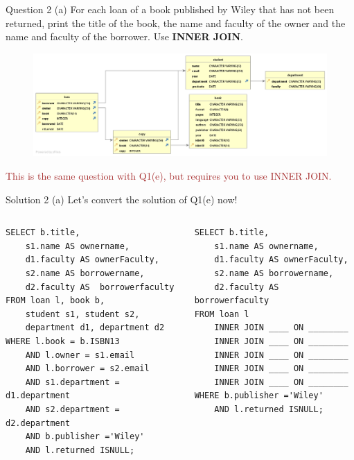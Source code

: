 \begin{frame}[fragile]{Question 2 (a)}
For each loan of a book published by Wiley that has not been returned, print the title of the book, the name and faculty of the owner and the name and faculty of the borrower. Use \textbf{INNER JOIN}.

\begin{figure}
	\includegraphics[width=1\textwidth]{t1/images/t1-end.png}
\end{figure}

\textcolor{brown}{This is the same question with Q1(e), but requires you to use INNER JOIN.}
\end{frame}

\begin{frame}[fragile]{Solution 2 (a)}
Let's convert the solution of Q1(e) now!\\
\vspace{10pt}

\begin{columns}

\begin{lstlisting}
SELECT b.title, 
	s1.name AS ownername, 
	d1.faculty AS ownerFaculty, 
	s2.name AS borrowername, 
	d2.faculty AS  borrowerfaculty
FROM loan l, book b,  
	student s1, student s2, 
	department d1, department d2
WHERE l.book = b.ISBN13
	AND l.owner = s1.email
	AND l.borrower = s2.email
	AND s1.department = d1.department
	AND s2.department = d2.department
	AND b.publisher ='Wiley'
	AND l.returned ISNULL;
\end{lstlisting}

\begin{lstlisting}
SELECT b.title, 
	s1.name AS ownername, 
	d1.faculty AS ownerFaculty, 
	s2.name AS borrowername, 
	d2.faculty AS  borrowerfaculty
FROM loan l 
	INNER JOIN ____ ON ________
	INNER JOIN ____ ON ________
	INNER JOIN ____ ON ________
	INNER JOIN ____ ON ________
	INNER JOIN ____ ON ________
WHERE b.publisher ='Wiley'
	AND l.returned ISNULL;
\end{lstlisting}
\end{columns}
	
\end{frame}


